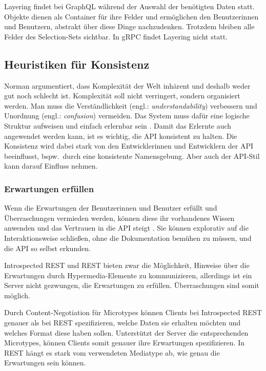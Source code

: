 Layering findet bei GraphQL während der Auswahl der benötigten Daten statt. Objekte dienen als Container für ihre Felder und ermöglichen den Benutzerinnen und Benutzern, abstrakt über diese Dinge nachzudenken. Trotzdem bleiben alle Felder des Selection-Sets sichtbar. In gRPC findet Layering nicht statt.


\subsection{Heuristiken für Konsistenz}
Norman argumentiert, dass Komplexität der Welt inhärent und deshalb weder gut noch schlecht ist. Komplexität soll nicht verringert, sondern organisiert werden. Man muss die Verständlichkeit (engl.: \textit{understandability}) verbessern und Unordnung (engl.: \textit{confusion}) vermeiden. Das System muss dafür eine logische Struktur aufweisen und einfach erlernbar sein \autocite{Norman2011}. Damit das Erlernte auch angewendet werden kann, ist es wichtig, die API konsistent zu halten. Die Konsistenz wird dabei stark von den Entwicklerinnen und Entwicklern der API beeinflusst, bspw.\ durch eine konsistente Namensgebung. Aber auch der API-Stil kann darauf Einfluss nehmen.

\subsubsection{Erwartungen erfüllen}
Wenn die Erwartungen der Benutzerinnen und Benutzer erfüllt und Überraschungen vermieden werden, können diese ihr vorhandenes Wissen anwenden und das Vertrauen in die API steigt \autocite[S.~132ff.]{Nielsen1994}. Sie können explorativ auf die Interaktionsweise schließen, ohne die Dokumentation bemühen zu müssen, und die API so selbst erkunden.

\para{}Introspected REST und REST bieten zwar die Möglichkeit, Hinweise über die Erwartungen durch Hypermedia-Elemente zu kommunizieren, allerdings ist ein Server nicht gezwungen, die Erwartungen zu erfüllen. Überraschungen sind somit möglich.

Durch Content-Negotiation für Microtypes können Clients bei Introspected REST genauer als bei REST spezifizieren, welche Daten sie erhalten möchten und welches Format diese haben sollen. Unterstützt der Server die entsprechenden Microtypes, können Clients somit genauer ihre Erwartungen spezifizieren. In REST hängt es stark vom verwendeten Mediatype ab, wie genau die Erwartungen sein können.

